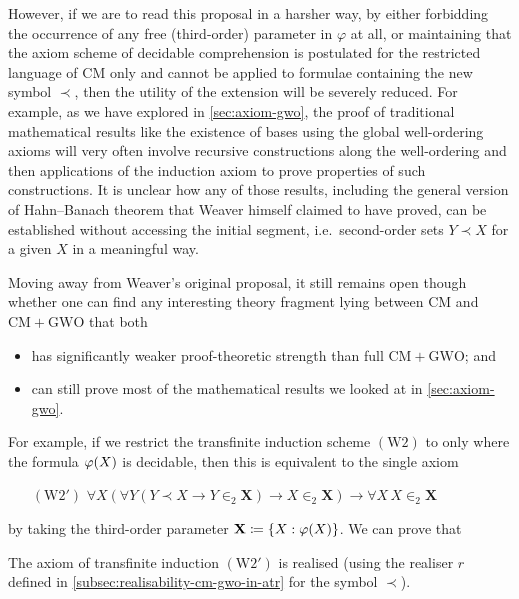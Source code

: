 \documentclass[11pt]{article}
\theoremstyle{plain}
\theoremstyle{definition}
\begin{document}
However, if we are to read this proposal in a harsher way, by either forbidding the occurrence of any free (third-order) parameter in $\varphi$ at all, or maintaining that the axiom scheme of decidable comprehension is postulated for the restricted language of $\mathrm{CM}$ only and cannot be applied to formulae containing the new symbol $\prec$, then the utility of the extension will be severely reduced. For example, as we have explored in \autoref{sec:axiom-gwo}, the proof of traditional mathematical results like the existence of bases using the global well-ordering axioms will very often involve recursive constructions along the well-ordering and then applications of the induction axiom to prove properties of such constructions. It is unclear how any of those results, including the general version of Hahn--Banach theorem that Weaver himself claimed to have proved, can be established without accessing the initial segment, i.e.\ second-order sets $Y \prec X$ for a given $X$ in a meaningful way.

Moving away from Weaver's original proposal, it still remains open though whether one can find any interesting theory fragment lying between $\mathrm{CM}$ and $\mathrm{CM} + \mathrm{GWO}$ that both
\begin{itemize}
    \item has significantly weaker proof-theoretic strength than full $\mathrm{CM} + \mathrm{GWO}$; and
    \item can still prove most of the mathematical results we looked at in \autoref{sec:axiom-gwo}.
\end{itemize}

For example, if we restrict the transfinite induction scheme $\left(\mathrm{W}2\right)$ to only where the formula $\varphi\mleft(X\mright)$ is decidable, then this is equivalent to the single axiom
\begin{enumerate}
    \item[$\left(\mathrm{W}2'\right)$] $\forall X \left(\forall Y \left(Y \prec X \rightarrow Y \in_2 \mathbf{X}\right) \rightarrow X \in_2 \mathbf{X}\right) \rightarrow \forall X \, X \in_2 \mathbf{X}$
\end{enumerate}
by taking the third-order parameter $\mathbf{X} \coloneqq \left\{X : \varphi\mleft(X\mright)\right\}$. We can prove that

\begin{proposition}
    \label{prop:atr-realise-decidable-ti}
    The axiom of transfinite induction $\left(\mathrm{W}2'\right)$ is realised (using the realiser $r$ defined in \autoref{subsec:realisability-cm-gwo-in-atr} for the symbol $\prec$).
\end{proposition}
\end{document}
